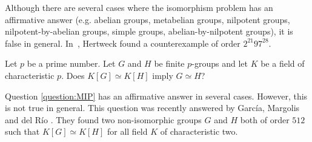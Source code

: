 Although there are several cases where 
the isomorphism problem has an affirmative answer (e.g. abelian groups, 
metabelian groups, nilpotent groups, nilpotent-by-abelian groups, simple groups, 
abelian-by-nilpotent groups), it is false in general. In~\cite{MR1847590},    
Hertweck found a counterexample of order $2^{21}97^{28}$.

\begin{question}
\label{question:MIP}
    Let $p$ be a prime number. Let 
    $G$ and $H$ be finite $p$-groups and let $K$ be a field of characteristic $p$. 
    Does $K[G]\simeq K[H]$ imply $G\simeq H$?
\end{question}   

Question \ref{question:MIP} has an affirmative answer in several cases. However, 
this is not true in general. This question was recently answered by Garc\'ia, Margolis and
del R\'io \cite{MR4373245}. They found two non-isomorphic groups $G$ and $H$ both of order $512$ 
such that $K[G]\simeq K[H]$ for all field $K$ 
of characteristic two. 
